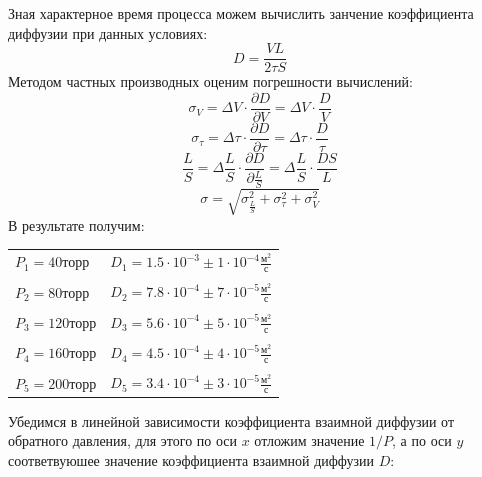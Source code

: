 \documentclass{article}
\begin{document}
Зная характерное время процесса можем вычислить занчение коэффициента диффузии при данных условиях:
\begin{equation}\label{diffusion}
D = \frac{V L}{2 \tau S}
\end{equation}
Методом частных производных оценим погрешности вычислений:
\begin{equation*}
    \sigma_{V} = \Delta{V} \cdot \frac{\partial{D}}{\partial{V}} = \Delta{V} \cdot \frac{D}{V}
\end{equation*}
\begin{equation*}
    \sigma_{\tau} = \Delta{\tau} \cdot \frac{\partial{D}}{\partial{\tau}} = \Delta{\tau} \cdot \frac{D}{\tau}
\end{equation*}
\begin{equation*}
    \frac{L}{S} = \Delta{\frac{L}{S}} \cdot \frac{\partial{D}}{\partial{\frac{L}{S}}} = \Delta{\frac{L}{S}} \cdot \frac{D S}{L}
\end{equation*}
\begin{equation*}
    \sigma = \sqrt{\sigma_{\frac{L}{S}}^2+\sigma_{\tau}^2+\sigma_{V}^2}
\end{equation*}
В результате получим:
\begin{table}[h]
    \centering
    \begin{tabular}{l r}
        $P_1 = 40 \text{торр} $ & $D_1 = 1.5 \cdot 10^{-3} \pm 1 \cdot 10^{-4} \frac{\text{м}^2}{\text{с}}$ \\
        \\
        $P_2 = 80 \text{торр} $ & $D_2 = 7.8 \cdot 10^{-4} \pm 7 \cdot 10^{-5} \frac{\text{м}^2}{\text{с}}$ \\
        \\
        $P_3 = 120 \text{торр} $ & $D_3 = 5.6 \cdot 10^{-4} \pm 5 \cdot 10^{-5} \frac{\text{м}^2}{\text{с}}$ \\
        \\
        $P_4 = 160 \text{торр} $ & $D_4 = 4.5 \cdot 10^{-4} \pm 4 \cdot 10^{-5} \frac{\text{м}^2}{\text{с}}$ \\
        \\
        $P_5 = 200 \text{торр} $ & $D_5 = 3.4 \cdot 10^{-4} \pm 3 \cdot 10^{-5} \frac{\text{м}^2}{\text{с}}$ \\
    \end{tabular}
\end{table}
\newpage
Убедимся в линейной зависимости коэффициента взаимной диффузии от обратного давления, для этого по оси $x$ отложим значение $1/P$, а по оси $y$ соответвуюшее значение коэффициента взаимной диффузии $D$:
\end{document}
